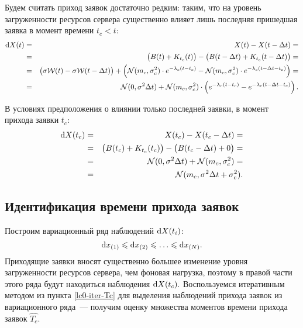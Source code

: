 \documentclass[a4paper,10pt]{article}
\begin{document}
Будем считать приход заявок достаточно редким: таким, что на уровень
загруженности ресурсов сервера существенно влияет лишь последняя пришедшая 
заявка в момент времени $t_c < t$:
\begin{eqnarray*}
\dif X(t) 
  & = & X(t) - X(t - \Delta t) = \\
  & = & \del{B(t) + K_{t_c}(t)} - 
      \del{B(t - \Delta t) + K_{t_c}(t - \Delta t)} = \\
  & = & \del{\sigma \mathcal{W}(t) - \sigma \mathcal{W}(t - \Delta t)} +
      \del{\mathcal{N}(m_c, \sigma_c^2) \cdot e^{-\lambda_c(t - t_c)} - 
           \mathcal{N}(m_c, \sigma_c^2) \cdot 
              e^{-\lambda_c(t - \Delta t - t_c)}} = \\
  & = & \mathcal{N}(0, \sigma^2 \Delta t) + 
      \mathcal{N}(m_c, \sigma_c^2) \cdot 
        \del{e^{-\lambda_c(t - t_c)} - e^{-\lambda_c(t - \Delta t - t_c)}}.
\end{eqnarray*}

В условиях предположения о влиянии только последней заявки, 
в момент прихода заявки $t_c$:
\begin{eqnarray*}
\dif X(t_c) 
  & = & X(t_c) - X(t_c - \Delta t) = \\
  & = & \del{B(t_c) + K_{t_c}(t_c)} - 
      \del{B(t_c - \Delta t) + 0} = \\
  & = & \mathcal{N}(0, \sigma^2 \Delta t) + 
      \mathcal{N}(m_c, \sigma_c^2) = \\
  & = & \mathcal{N}(m_c, \sigma^2 \Delta t + \sigma_c^2).
\end{eqnarray*}

\subsection{Идентификация времени прихода заявок}
Построим вариационный ряд наблюдений $\dif X(t_i)$:
$$\dif x_{(1)} \leqslant \dif x_{(2)} \leqslant \ldots 
  \leqslant \dif x_{(N)}.$$
Приходящие заявки вносят существенно большее изменение уровня загруженности
ресурсов сервера, чем фоновая нагрузка, 
поэтому в правой части этого ряда будут находиться наблюдения 
$\dif X(t_c).$
Воспользуемся итеративным методом из пункта \ref{lc0-iter-Tc} для выделения
наблюдений прихода заявок из вариационного ряда~--- 
получим оценку множества моментов времени прихода заявок $\widehat{T_c}$.
\end{document}

